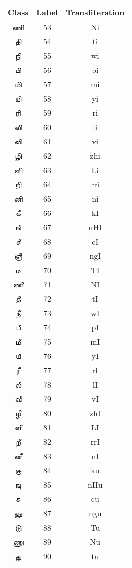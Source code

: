 \documentclass[a4paper,10pt]{article}
\begin{document}
\begin{table}[!t]\center
\begin{tabular}{ccc}
\toprule
\textbf{Class} & \textbf{Label} & \textbf{Transliteration}  \\
\midrule


\t{ ணி } & 53 & Ni \\
\t{ தி } & 54 & ti \\
\t{ நி } & 55 & wi \\
\t{ பி } & 56 & pi \\
\t{ மி } & 57 & mi \\
\t{ யி } & 58 & yi \\
\t{ ரி } & 59 & ri \\
\t{ லி } & 60 & li \\
\t{ வி } & 61 & vi \\
\t{ ழி } & 62 & zhi \\
\t{ ளி } & 63 & Li \\
\t{ றி } & 64 & rri \\
\t{ னி } & 65 & ni \\
\t{ கீ } & 66 & kI \\
\t{ ஙீ } & 67 & nHI \\
\t{ சீ } & 68 & cI \\
\t{ ஞீ } & 69 & ngI \\
\t{ டீ } & 70 & TI \\
\t{ ணீ } & 71 & NI \\
\t{ தீ } & 72 & tI \\
\t{ நீ } & 73 & wI \\
\t{ பீ } & 74 & pI \\
\t{ மீ } & 75 & mI \\
\t{ யீ } & 76 & yI \\
\t{ ரீ } & 77 & rI \\
\t{ லீ } & 78 & lI \\
\t{ வீ } & 79 & vI \\
\t{ ழீ } & 80 & zhI \\
\t{ ளீ } & 81 & LI \\
\t{ றீ } & 82 & rrI \\
\t{ னீ } & 83 & nI \\
\t{ கு } & 84 & ku \\
\t{ ஙு } & 85 & nHu \\
\t{ சு } & 86 & cu \\
\t{ ஞு } & 87 & ngu \\
\t{ டு } & 88 & Tu \\
\t{ ணு } & 89 & Nu \\
\t{ து } & 90 & tu \\

\end{tabular}
\end{table}
\end{document}
